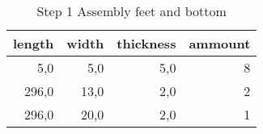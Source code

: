 \begin{table}[h!]
\centering
\caption{Step 1 Assembly feet and bottom}
\begin{tabular}{rrrr}
\toprule
 length &  width &  thickness &  ammount \\
\midrule
    5,0 &    5,0 &        5,0 &        8 \\
  296,0 &   13,0 &        2,0 &        2 \\
  296,0 &   20,0 &        2,0 &        1 \\
\bottomrule
\end{tabular}
\end{table}
